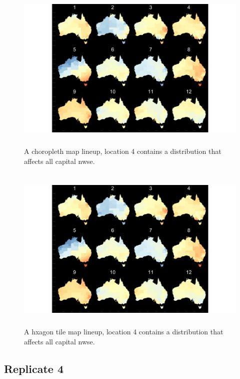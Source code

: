 \documentclass{monashthesis}
\begin{document}
\begin{figure}[H]
\centering
\includegraphics[height=8cm]{lineups/nwse-geo5-1.pdf}
\caption{\label{fig:nwse-geo5}A choropleth map lineup, location 4 contains a distribution that affects all capital nwse.}
\end{figure}

\begin{figure}[H]
\centering
\includegraphics[height=8cm]{lineups/nwse-hex5-1.pdf}
\caption{\label{fig:nwse-hex5}A hxagon tile map lineup, location 4 contains a distribution that affects all capital nwse.}
\end{figure}

\hypertarget{replicate-4-2}{%
\subsection{Replicate 4}\label{replicate-4-2}}
\end{document}
